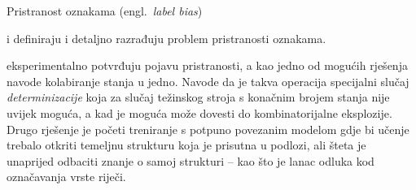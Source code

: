 Pristranost oznakama (engl.~\emph{label bias})

\citet*{lafferty2001conditional} i \citet*{leon1991approche} definiraju i
detaljno razrađuju problem pristranosti oznakama.

\citet*{lafferty2001conditional} eksperimentalno potvrđuju pojavu pristranosti, a kao jedno od mogućih rješenja navode kolabiranje stanja u jedno. Navode da je takva operacija specijalni slučaj \emph{determinizacije} koja za slučaj težinskog stroja s konačnim brojem stanja nije uvijek moguća, a kad je moguća može dovesti do kombinatorijalne eksplozije. Drugo rješenje je početi treniranje s potpuno povezanim modelom gdje bi učenje trebalo otkriti temeljnu strukturu koja je prisutna u podlozi, ali šteta je unaprijed odbaciti znanje o samoj strukturi -- kao što je lanac odluka kod označavanja vrste riječi.
